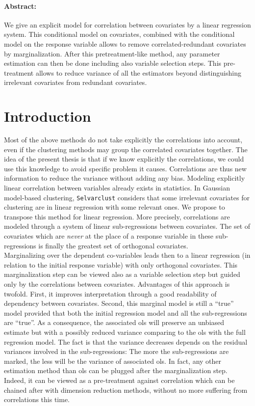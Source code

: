 \documentclass[12pt,a4paper]{report}
\begin{document}
\paragraph{Abstract:} 
We give an explicit model for correlation between covariates by a linear regression system. 
This conditional model on covariates, combined with the conditional model on the response variable allows to remove correlated-redundant covariates by marginalization.
 After this pretreatment-like method, any parameter estimation can then be done including also variable selection steps. This pre-treatment allows to reduce variance of all the estimators beyond distinguishing irrelevant covariates from redundant covariates.
\\
\section{Introduction}
Most of the above methods do not take explicitly the correlations into account, even if the clustering methods may group the correlated covariates together.
The idea of the present thesis is that if we know explicitly the correlations, we could use this knowledge to avoid specific problem it causes. Correlations are thus new information to reduce the variance without adding any bias. 
Modeling explicitly linear correlation between variables already exists in statistics. In Gaussian model-based clustering, {\tt Selvarclust} \cite{maugis2009variable} considers that some irrelevant covariates for clustering are in linear regression with some relevant ones.
 We propose to transpose this method for linear regression.
More precisely, correlations are modeled through a system of linear sub-regressions between covariates. The set of covariates which are {\it never} at the place of a response variable in these sub-regressions is finally the greatest set of orthogonal covariates.\\

 Marginalizing over the dependent co-variables leads then to a linear regression (in relation to the initial response variable) with only orthogonal covariates. This marginalization step can be viewed also as a variable selection step but guided only by the correlations between covariates. Advantages of this approach is twofold. First, it improves interpretation through a good readability of dependency between covariates. Second, this marginal model is still a ``true'' model provided that both the initial regression model and all the sub-regressions are ``true''. As a consequence, the associated {\sc ols} will preserve an unbiased estimate but with a possibly reduced variance comparing to the {\sc ols} with the full regression model. The fact is that the variance decreases depends on the residual variances involved in the sub-regressions: The more the sub-regressions are marked, the less will be the variance of associated {\sc ols}. In fact, any other estimation method than {\sc ols} can be plugged after the marginalization step. Indeed, it can be viewed as a pre-treatment against correlation which can be chained after with dimension reduction methods, without no more suffering from correlations this time.
\end{document}
